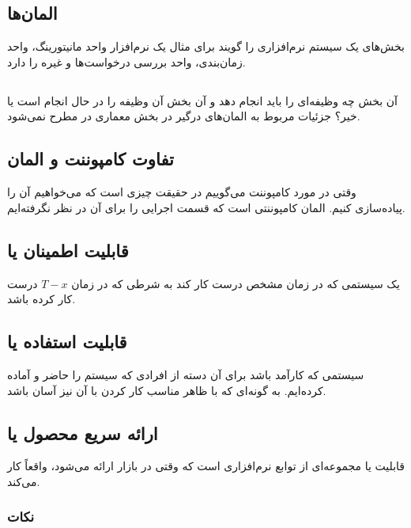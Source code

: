 \documentclass[a4paper]{article}
\begin{document}
\subsection{المان‌ها}

بخش‌های یک سیستم نرم‌افزاری را گویند برای مثال یک نرم‌افزار واحد مانیتورینگ،
واحد زمان‌بندی، واحد بررسی درخواست‌ها و غیره را دارد.

\subsection{}

آن بخش چه وظیفه‌ای را باید انجام دهد و آن بخش آن وظیفه را در حال انجام است یا
خیر؟ جزئیات مربوط به المان‌های درگیر در بخش معماری در  مطرح نمی‌شود.

\subsection{تفاوت کامپوننت و المان}

وقتی در مورد کامپوننت می‌گوییم در حقیقت چیزی است که می‌خواهیم آن را پیاده‌سازی
کنیم. المان کامپوننتی است که قسمت اجرایی را برای آن در نظر نگرفته‌ایم.

\subsection{قابلیت اطمینان یا }

یک سیستمی که در زمان مشخص درست کار کند به شرطی که در زمان $T - x$ درست کار کرده
باشد.

\subsection{قابلیت استفاده یا }

سیستمی که کارآمد باشد برای آن دسته از افرادی که سیستم را حاضر و آماده کرده‌ایم.
به گونه‌ای که با ظاهر مناسب کار کردن با آن نیز آسان باشد.

\subsection{ارائه سریع محصول یا }

قابلیت یا  مجموعه‌ای از توابع نرم‌افزاری است که وقتی در بازار ارائه
می‌شود، واقعاً کار می‌کند. 

\subsubsection*{نکات}
\end{document}
